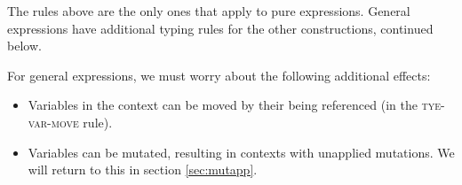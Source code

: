 \documentclass[acmsmall,nonacm]{acmart}
\newcommand{\proves}{\vdash}
\newcommand{\makes}{\dashv}
\begin{document}

The rules above are the only ones that apply to pure expressions. General expressions have additional typing rules for the other constructions, continued below.

For general expressions, we must worry about the following additional effects:
\begin{itemize}
  \item Variables in the context can be moved by their being referenced (in the \textsc{tye-var-move} rule).
  \item Variables can be mutated, resulting in contexts with unapplied mutations. We will return to this in section \ref{sec:mutapp}.
\end{itemize}
\end{document}
